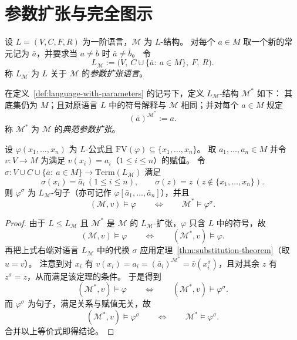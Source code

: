 \documentclass[lang=cn,a4paper,newtx,section]{elegantbook}
\begin{document}
\section{参数扩张与完全图示}

\begin{definition}[参数扩张语言]
\label{language-with-parameters}
设 $L=(V,C,F,R)$ 为一阶语言，$\mathcal M$ 为 $L$-结构。
对每个 $a\in M$ 取一个新的常元记为 $\bar a$，并要求当 $a\neq b$ 时 $\bar a\neq \bar b$。
令
\[
  L_{\mathcal M}:=\bigl(V,\ C\cup\{\bar a:\ a\in M\},\ F,\ R\bigr).
\]
称 $L_{\mathcal M}$ 为 $L$ 关于 $\mathcal M$ 的\emph{参数扩张语言}。
\end{definition}

\begin{definition}[典范参数扩张结构]
\label{canonical-parameter-expansion}
在定义~\ref{def:language-with-parameters} 的记号下，定义 $L_{\mathcal M}$-结构 $\mathcal M^*$ 如下：
其底集仍为 $M$；且对原语言 $L$ 中的符号解释与 $\mathcal M$ 相同；并对每个 $a\in M$ 规定
\[
  (\bar a)^{\mathcal M^*}:=a.
\]
称 $\mathcal M^*$ 为 $\mathcal M$ 的\emph{典范参数扩张}。
\end{definition}

\begin{proposition}[带参数公式与句子的等价]
\label{parameters-as-sentences}
设 $\varphi(x_1,\dots,x_n)$ 为 $L$-公式且 $\mathrm{FV}(\varphi)\subseteq\{x_1,\dots,x_n\}$。
取 $a_1,\dots,a_n\in M$ 并令 $v:V\to M$ 为满足 $v(x_i)=a_i$（$1\le i\le n$）的赋值。
令 $\sigma:V\cup C\cup\{\bar a:\ a\in M\}\to\mathrm{Term}(L_{\mathcal M})$ 满足
\[
  \sigma(x_i)=\bar a_i\ (1\le i\le n),\qquad \sigma(z)=z\ (z\notin\{x_1,\dots,x_n\}).
\]
则 $\varphi^{\sigma}$ 为 $L_{\mathcal M}$-句子（亦可记作 $\varphi[\bar a_1,\dots,\bar a_n]$），并且
\[
  (\mathcal M,v)\models\varphi\qquad\Longleftrightarrow\qquad\mathcal M^*\models\varphi^{\sigma}.
\]
\end{proposition}

\begin{proof}
由于 $L\le L_{\mathcal M}$ 且 $\mathcal M^*$ 是 $\mathcal M$ 的 $L_{\mathcal M}$-扩张，$\varphi$ 只含 $L$ 中的符号，故
\[
  (\mathcal M,v)\models\varphi\qquad\Longleftrightarrow\qquad(\mathcal M^*,v)\models\varphi.
\]
再把上式右端对语言 $L_{\mathcal M}$ 中的代换 $\sigma$ 应用定理~\ref{thm:substitution-theorem}（取 $u=v$）。
注意到对 $x_i$ 有 $v(x_i)=a_i=(\bar a_i)^{\mathcal M^*}=\bar v(x_i^{\sigma})$，且对其余 $z$ 有 $z^{\sigma}=z$，从而满足该定理的条件。
于是得到
\[
  (\mathcal M^*,v)\models\varphi\qquad\Longleftrightarrow\qquad(\mathcal M^*,v)\models\varphi^{\sigma}.
\]
而 $\varphi^{\sigma}$ 为句子，满足关系与赋值无关，故
\[
  (\mathcal M^*,v)\models\varphi^{\sigma}\qquad\Longleftrightarrow\qquad\mathcal M^*\models\varphi^{\sigma}.
\]
合并以上等价式即得结论。
\end{proof}
\end{document}
